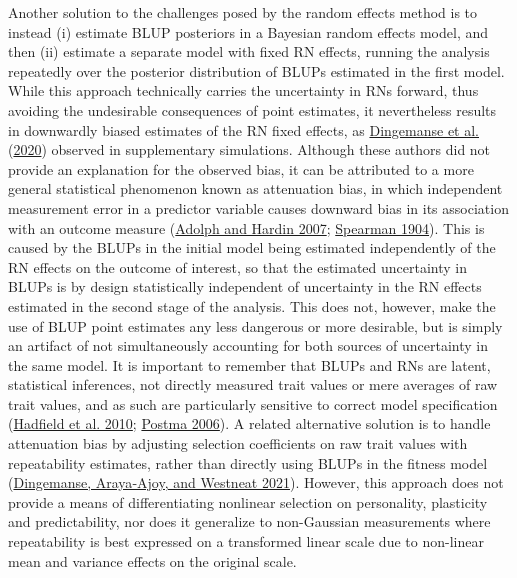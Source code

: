 \documentclass{article}
\begin{document}
Another solution to the challenges posed by the random effects method is
to instead (i) estimate BLUP posteriors in a Bayesian random effects
model, and then (ii) estimate a separate model with fixed RN effects,
running the analysis repeatedly over the posterior distribution of BLUPs
estimated in the first model. While this approach technically carries
the uncertainty in RNs forward, thus avoiding the undesirable
consequences of point estimates, it nevertheless results in downwardly
biased estimates of the RN fixed effects, as
\protect\hyperlink{ref-Ding2020b}{Dingemanse et al.}
(\protect\hyperlink{ref-Ding2020b}{2020}) observed in supplementary
simulations. Although these authors did not provide an explanation for
the observed bias, it can be attributed to a more general statistical
phenomenon known as attenuation bias, in which independent measurement
error in a predictor variable causes downward bias in its association
with an outcome measure (\protect\hyperlink{ref-Adolf2007}{Adolph and
Hardin 2007}; \protect\hyperlink{ref-Spearman1904}{Spearman 1904}). This
is caused by the BLUPs in the initial model being estimated
independently of the RN effects on the outcome of interest, so that the
estimated uncertainty in BLUPs is by design statistically independent of
uncertainty in the RN effects estimated in the second stage of the
analysis. This does not, however, make the use of BLUP point estimates
any less dangerous or more desirable, but is simply an artifact of not
simultaneously accounting for both sources of uncertainty in the same
model. It is important to remember that BLUPs and RNs are latent,
statistical inferences, not directly measured trait values or mere
averages of raw trait values, and as such are particularly sensitive to
correct model specification
(\protect\hyperlink{ref-Hadfield2010}{Hadfield et al. 2010};
\protect\hyperlink{ref-Postma2006}{Postma 2006}). A related alternative
solution is to handle attenuation bias by adjusting selection
coefficients on raw trait values with repeatability estimates, rather
than directly using BLUPs in the fitness model
(\protect\hyperlink{ref-Ding2021}{Dingemanse, Araya‐Ajoy, and Westneat
2021}). However, this approach does not provide a means of
differentiating nonlinear selection on personality, plasticity and
predictability, nor does it generalize to non-Gaussian measurements
where repeatability is best expressed on a transformed linear scale due
to non-linear mean and variance effects on the original scale.
\end{document}
